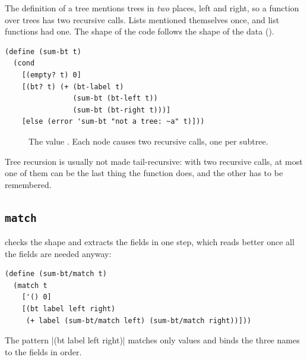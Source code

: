 The definition of a tree mentions trees in \emph{two} places, left and right, so a function over trees has two recursive calls. Lists mentioned themselves once, and list functions had one. The shape of the code follows the shape of the data ().

\begin{lstlisting}
(define (sum-bt t)
  (cond
    [(empty? t) 0]
    [(bt? t) (+ (bt-label t)
                (sum-bt (bt-left t))
                (sum-bt (bt-right t)))]
    [else (error 'sum-bt "not a tree: ~a" t)]))
\end{lstlisting}

\begin{figure}[htbp]
\centering
{}
\hspace{1.2cm}
\caption{The value . Each  node causes two recursive calls, one per subtree.}
\label{fig:bt}
\end{figure}

Tree recursion is usually not made tail-recursive: with two recursive calls, at most one of them can be the last thing the function does, and the other has to be remembered.

\subsection{\texttt{match}}

 checks the shape and extracts the fields in one step, which reads better once all the fields are needed anyway:
\begin{lstlisting}
(define (sum-bt/match t)
  (match t
    ['() 0]
    [(bt label left right)
     (+ label (sum-bt/match left) (sum-bt/match right))]))
\end{lstlisting}
The pattern \rkt|(bt label left right)| matches only  values and binds the three names to the fields in order.
